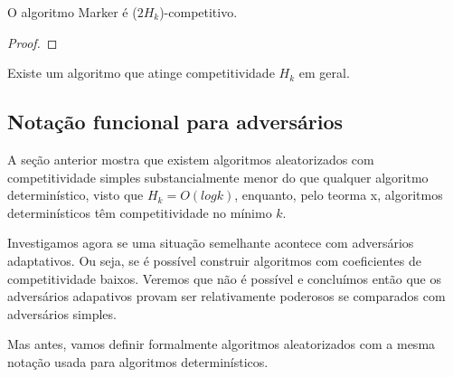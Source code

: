 \begin{theorem}

  O algoritmo Marker é (\(2H_k\))-competitivo.
  
  \begin{proof}
    
  \end{proof}
  
\end{theorem}


Existe um algoritmo que atinge competitividade \(H_k\) em geral.

\subsection{Notação funcional para adversários}

A seção anterior mostra que existem algoritmos aleatorizados com competitividade simples substancialmente menor do que qualquer algoritmo determinístico, visto que \(H_k = O(log k)\), enquanto, pelo teorma x, algoritmos determinísticos têm competitividade no mínimo \(k\).

Investigamos agora se uma situação semelhante acontece com adversários adaptativos. Ou seja, se é possível construir algoritmos com coeficientes de competitividade baixos. Veremos que não é possível e concluímos então que os adversários adapativos provam ser relativamente poderosos se comparados com adversários simples.

Mas antes, vamos definir formalmente algoritmos aleatorizados com a mesma notação usada para algoritmos determinísticos.
